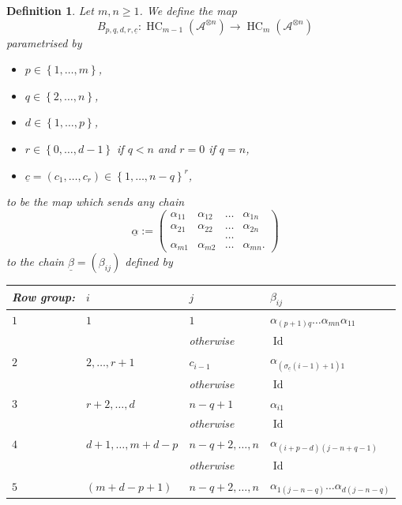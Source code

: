 \documentclass[10pt,a4paper]{amsart}
\def\A{{\mathcal{A}}}
\newtheorem{defn}{Definition}
\DeclareMathOperator{\hochcx}{{HC}}
\DeclareMathOperator{\id}{Id}
\begin{document}
\begin{defn}
\label{defn-cut-and-slice-matrix-operation-bpqdrc}
Let $m,n \geq 1$. We define the map 
\begin{equation}
B_{p,q,d,r,\underline{c}}\colon 
\hochcx_{m-1}(\A^{\otimes n})  \rightarrow 
\hochcx_{m}(\A^{\otimes n})
\end{equation}
parametrised by
\begin{itemize}
\item $p \in \left\{1, \dots, m\right\}$,
\item $q \in \left\{2, \dots, n\right\}$,
\item $d \in \left\{1, \dots, p\right\}$, 
\item $r \in \left\{0, \dots, d-1\right\}$ if $q < n$ and $r = 0$ if $q = n$, 
\item $\underline{c} = (c_1, \dots, c_r) \in \left\{ 1, \dots, n-q \right\}^r$,
\end{itemize}
to be the map 
which sends any chain
\begin{equation*}
\underline{\alpha}
:= 
\begin{pmatrix}
\alpha_{11} & \alpha_{12} & \dots & \alpha_{1n}  
\\
\alpha_{21} & \alpha_{22} & \dots & \alpha_{2n}  
\\
& & \dots & 
\\
\alpha_{m1} & \alpha_{m2} & \dots & \alpha_{mn}. 
\end{pmatrix} 
\end{equation*}
to the chain $\underline{\beta} = (\beta_{ij})$ defined by 
\\
\begin{tabular}{|l|l|l|l|}
\hline
Row group:
&
$i$
&
$j$
&
$\beta_{ij}$
\\
\hline
$1$
&
$1$ 
&
$1$
&
$\alpha_{(p+1)q}\dots\alpha_{mn}\alpha_{11}$
\\
&
&
otherwise
&
$\id$
\\
\hline
$2$
&
$2,\dots,r+1$
&
$c_{i-1}$
&
$\alpha_{\left(\sigma_{\underline{c}}(i-1)+1\right)1}$
\\
&
&
otherwise
&
$\id$
\\
\hline
$3$
&
$r+2, \dots, d$
& 
$n-q+1$
&
$\alpha_{i1}$
\\
& 
&
otherwise
&
$\id$ 
\\
\hline
$4$
&
$d+1, \dots, m+d-p$
&
$n-q+2,\dots, n$
&
$\alpha_{(i+p-d)(j-n+q-1)}$
\\
&
&
otherwise
& 
$\id$  
\\
\hline
$5$
&
$(m+d-p+1)$
& 
$n-q+2,\dots,n$
&
$\alpha_{1(j-n-q)}\dots\alpha_{d(j-n-q)}$  

\end{tabular}
\end{defn}
\end{document}
